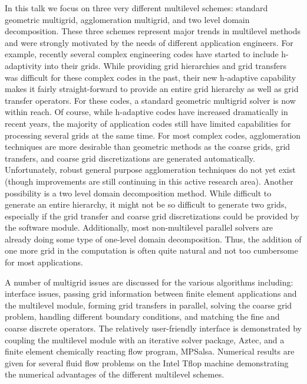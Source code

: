 \documentclass[11pt]{article}
\begin{document}
In this talk we focus on three very different multilevel schemes:
standard geometric multigrid, agglomeration multigrid, and two level
domain decomposition.
These three schemes represent major trends in multilevel
methods and were strongly motivated by the needs of different
application engineers. For example, recently several complex engineering
codes have started to include h-adaptivity into their grids.  While providing
grid hierarchies and grid transfers was difficult for these complex codes in
the past, their new h-adaptive capability makes it fairly straight-forward to
provide an entire grid hierarchy as well as grid transfer operators. For
these codes,  a standard geometric multigrid solver is now within reach.
Of course, while h-adaptive codes have increased dramatically in recent
years, the majority of application codes still have limited capabilities for
processing several grids at the same time.  For most complex codes,
agglomeration techniques are more desirable than geometric methods
as the coarse grids, grid transfers, and coarse grid discretizations are
generated automatically.  Unfortunately, robust general purpose agglomeration
techniques do not yet exist (though improvements are still continuing in this
active research area). Another possibility is a two level domain decomposition
method. While
difficult to generate an entire hierarchy, it might not be so difficult to
generate two grids, especially if the grid transfer and coarse grid
discretizations could be provided by the software module. Additionally, most
non-multilevel parallel solvers are already doing some type of one-level
domain decomposition.  Thus, the addition of one more grid in the computation
is often quite natural and not too cumbersome for most applications.

A number of multigrid issues are discussed for the various algorithms
including: interface issues, passing grid information between finite element
applications and the multilevel module, forming grid transfers in parallel,
solving the coarse grid problem, handling different boundary conditions, and
matching the fine and coarse discrete operators.
The relatively user-friendly interface is demonstrated by coupling
the multilevel module with an iterative solver package, Aztec,
and a finite element chemically reacting flow program, MPSalsa.
Numerical results are given for several fluid flow problems on the
Intel Tflop machine demonstrating the numerical advantages of the different
multilevel schemes.


\end{document}
